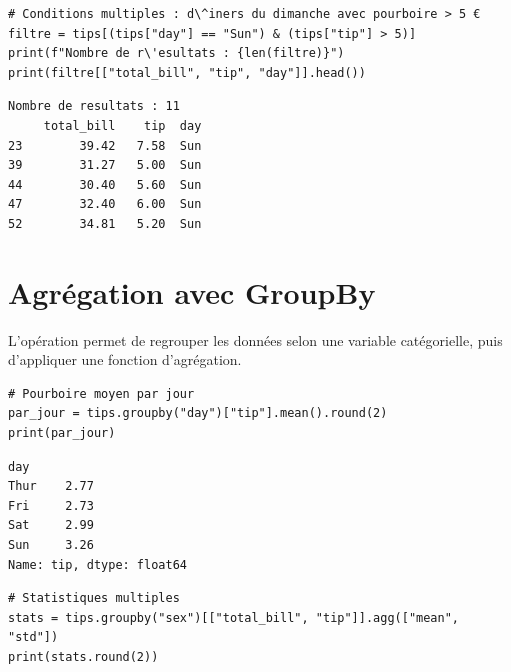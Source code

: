 \begin{codeblock}[title=\textbf{Python}]
\begin{verbatim}
# Conditions multiples : d\^iners du dimanche avec pourboire > 5 €
filtre = tips[(tips["day"] == "Sun") & (tips["tip"] > 5)]
print(f"Nombre de r\'esultats : {len(filtre)}")
print(filtre[["total_bill", "tip", "day"]].head())
\end{verbatim}
\end{codeblock}

\begin{codeoutput}
\begin{verbatim}
Nombre de resultats : 11
     total_bill    tip  day
23        39.42   7.58  Sun
39        31.27   5.00  Sun
44        30.40   5.60  Sun
47        32.40   6.00  Sun
52        34.81   5.20  Sun
\end{verbatim}
\end{codeoutput}

\section{Agr\'egation avec GroupBy}

L'op\'eration  permet de regrouper les donn\'ees selon une variable
cat\'egorielle, puis d'appliquer une fonction d'agr\'egation.

\begin{codeblock}[title=\textbf{Python}]
\begin{verbatim}
# Pourboire moyen par jour
par_jour = tips.groupby("day")["tip"].mean().round(2)
print(par_jour)
\end{verbatim}
\end{codeblock}

\begin{codeoutput}
\begin{verbatim}
day
Thur    2.77
Fri     2.73
Sat     2.99
Sun     3.26
Name: tip, dtype: float64
\end{verbatim}
\end{codeoutput}

\begin{codeblock}[title=\textbf{Python}]
\begin{verbatim}
# Statistiques multiples
stats = tips.groupby("sex")[["total_bill", "tip"]].agg(["mean", "std"])
print(stats.round(2))
\end{verbatim}
\end{codeblock}

